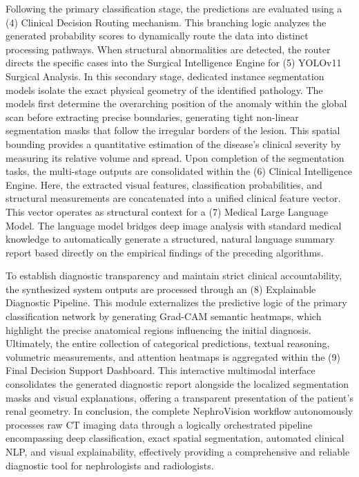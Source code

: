 \documentclass[]{elsarticle}
\begin{document}
Following the primary classification stage, the predictions are evaluated using a (4) Clinical Decision Routing mechanism. This branching logic analyzes the generated probability scores to dynamically route the data into distinct processing pathways. When structural abnormalities are detected, the router directs the specific cases into the Surgical Intelligence Engine for (5) YOLOv11 Surgical Analysis. In this secondary stage, dedicated instance segmentation models isolate the exact physical geometry of the identified pathology. The models first determine the overarching position of the anomaly within the global scan before extracting precise boundaries, generating tight non-linear segmentation masks that follow the irregular borders of the lesion. This spatial bounding provides a quantitative estimation of the disease's clinical severity by measuring its relative volume and spread. Upon completion of the segmentation tasks, the multi-stage outputs are consolidated within the (6) Clinical Intelligence Engine. Here, the extracted visual features, classification probabilities, and structural measurements are concatenated into a unified clinical feature vector. This vector operates as structural context for a (7) Medical Large Language Model. The language model bridges deep image analysis with standard medical knowledge to automatically generate a structured, natural language summary report based directly on the empirical findings of the preceding algorithms.

To establish diagnostic transparency and maintain strict clinical accountability, the synthesized system outputs are processed through an (8) Explainable Diagnostic Pipeline. This module externalizes the predictive logic of the primary classification network by generating Grad-CAM semantic heatmaps, which highlight the precise anatomical regions influencing the initial diagnosis. Ultimately, the entire collection of categorical predictions, textual reasoning, volumetric measurements, and attention heatmaps is aggregated within the (9) Final Decision Support Dashboard. This interactive multimodal interface consolidates the generated diagnostic report alongside the localized segmentation masks and visual explanations, offering a transparent presentation of the patient's renal geometry. In conclusion, the complete NephroVision workflow autonomously processes raw CT imaging data through a logically orchestrated pipeline encompassing deep classification, exact spatial segmentation, automated clinical NLP, and visual explainability, effectively providing a comprehensive and reliable diagnostic tool for nephrologists and radiologists.
\end{document}
